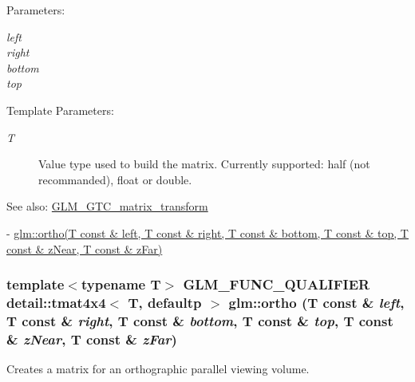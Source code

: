 \begin{Desc}
\item[Parameters:]
\begin{description}
\item[{\em left}]\item[{\em right}]\item[{\em bottom}]\item[{\em top}]\end{description}
\end{Desc}
\begin{Desc}
\item[Template Parameters:]
\begin{description}
\item[{\em T}]Value type used to build the matrix. Currently supported: half (not recommanded), float or double. \end{description}
\end{Desc}
\begin{Desc}
\item[See also:]\hyperlink{group__gtc__matrix__transform}{GLM\_\-GTC\_\-matrix\_\-transform} 

- \hyperlink{group__gtc__matrix__transform_gf420978f35ff47883f417cef1e4d6a15}{glm::ortho(T const \& left, T const \& right, T const \& bottom, T const \& top, T const \& zNear, T const \& zFar)} \end{Desc}
\hypertarget{group__gtc__matrix__transform_gf420978f35ff47883f417cef1e4d6a15}{
\subsubsection[ortho]{\setlength{\rightskip}{0pt plus 5cm}template$<$typename T$>$ GLM\_\-FUNC\_\-QUALIFIER detail::tmat4x4$<$ T, defaultp $>$ glm::ortho (T const \& {\em left}, \/  T const \& {\em right}, \/  T const \& {\em bottom}, \/  T const \& {\em top}, \/  T const \& {\em zNear}, \/  T const \& {\em zFar})}}
\label{group__gtc__matrix__transform_gf420978f35ff47883f417cef1e4d6a15}


Creates a matrix for an orthographic parallel viewing volume.


